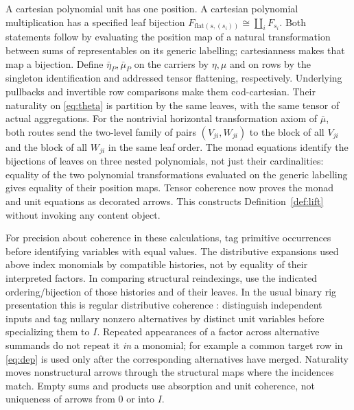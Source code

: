 \documentclass[11pt]{article}
\theoremstyle{definition}\newtheorem{definition}[theorem]{Definition}
\begin{document}
A cartesian polynomial unit has one position. A cartesian polynomial
multiplication has a specified leaf bijection
$F_{\mathrm{flat}(s,(s_i))}\cong\coprod_i F_{s_i}$.
Both statements follow by evaluating the position map of a natural
transformation between sums of representables on its generic labelling;
cartesianness makes that map a bijection. Define
$\bar\eta_P,\bar\mu_P$ on the carriers by $\eta,\mu$ and on rows by
the singleton identification and addressed tensor flattening,
respectively. Underlying pullbacks and invertible row comparisons
make them cod-cartesian. Their naturality on \eqref{eq:theta} is
partition by the same leaves, with the same tensor of actual
aggregations. For the nontrivial horizontal transformation axiom of
$\bar\mu$, both routes send the two-level family of pairs
$(V_{ji},W_{ji})$ to the block of all $V_{ji}$ and the block of all
$W_{ji}$ in the same leaf order. The monad equations identify the
bijections of leaves on three nested polynomials, not just their
cardinalities: equality of the two polynomial transformations
evaluated on the generic labelling gives equality of their position
maps. Tensor coherence now proves the monad and unit equations as
decorated arrows. This constructs Definition~\ref{def:lift} without
invoking any content object.

For precision about coherence in these calculations, tag primitive
occurrences before identifying variables with equal values. The
distributive expansions used above index monomials by compatible
histories, not by equality of their interpreted factors. In comparing
structural reindexings, use the indicated ordering/bijection of those
histories and of their leaves. In the usual binary rig presentation
this is regular distributive coherence \cite{Lap}: distinguish
independent inputs and tag nullary nonzero alternatives by distinct
unit variables before specializing them to $I$. Repeated appearances
of a factor across alternative summands do not repeat it \emph{in}
a monomial; for example a common target row in \eqref{eq:dep} is used
only after the corresponding alternatives have merged. Naturality
moves nonstructural arrows through the structural maps where the
incidences match. Empty sums and products use absorption and unit
coherence, not uniqueness of arrows from $0$ or into $I$.
\end{document}
